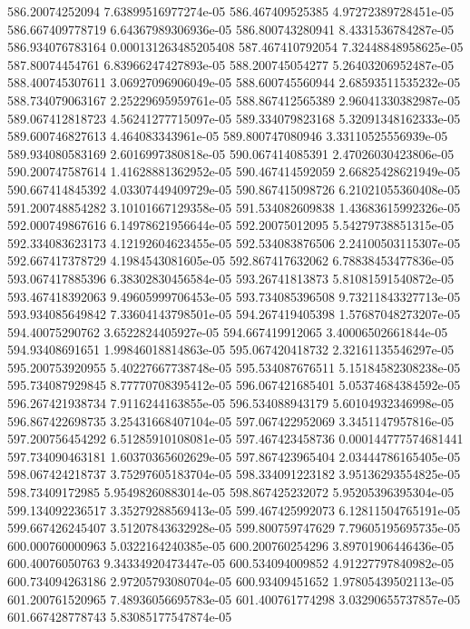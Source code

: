 {586.20074252094 7.63899516977274e-05
586.467409525385 4.97272389728451e-05
586.667409778719 6.64367989306936e-05
586.800743280941 8.4331536784287e-05
586.934076783164 0.000131263485205408
587.467410792054 7.32448848958625e-05
587.80074454761 6.83966247427893e-05
588.200745054277 5.26403206952487e-05
588.400745307611 3.06927096906049e-05
588.600745560944 2.68593511535232e-05
588.734079063167 2.25229695959761e-05
588.867412565389 2.96041330382987e-05
589.067412818723 4.56241277715097e-05
589.334079823168 5.32091348162333e-05
589.600746827613 4.464083343961e-05
589.800747080946 3.33110525556939e-05
589.934080583169 2.6016997380818e-05
590.067414085391 2.47026030423806e-05
590.200747587614 1.41628881362952e-05
590.467414592059 2.66825428621949e-05
590.667414845392 4.03307449409729e-05
590.867415098726 6.21021055360408e-05
591.200748854282 3.10101667129358e-05
591.534082609838 1.43683615992326e-05
592.000749867616 6.14978621956644e-05
592.20075012095 5.54279738851315e-05
592.334083623173 4.12192604623455e-05
592.534083876506 2.24100503115307e-05
592.667417378729 4.1984543081605e-05
592.867417632062 6.78838453477836e-05
593.067417885396 6.38302830456584e-05
593.26741813873 5.81081591540872e-05
593.467418392063 9.49605999706453e-05
593.734085396508 9.73211843327713e-05
593.934085649842 7.33604143798501e-05
594.267419405398 1.57687048273207e-05
594.40075290762 3.6522824405927e-05
594.667419912065 3.40006502661844e-05
594.93408691651 1.99846018814863e-05
595.067420418732 2.32161135546297e-05
595.200753920955 5.40227667738748e-05
595.534087676511 5.15184582308238e-05
595.734087929845 8.77770708395412e-05
596.067421685401 5.05374684384592e-05
596.267421938734 7.9116244163855e-05
596.534088943179 5.60104932346998e-05
596.867422698735 3.25431668407104e-05
597.067422952069 3.3451147957816e-05
597.200756454292 6.51285910108081e-05
597.467423458736 0.000144777574681441
597.734090463181 1.60370365602629e-05
597.867423965404 2.03444786165405e-05
598.067424218737 3.75297605183704e-05
598.334091223182 3.95136293554825e-05
598.73409172985 5.95498260883014e-05
598.867425232072 5.95205396395304e-05
599.134092236517 3.35279288569413e-05
599.467425992073 6.12811504765191e-05
599.667426245407 3.51207843632928e-05
599.800759747629 7.79605195695735e-05
600.000760000963 5.0322164240385e-05
600.200760254296 3.89701906446436e-05
600.40076050763 9.34334920473447e-05
600.534094009852 4.91227797840982e-05
600.734094263186 2.97205793080704e-05
600.93409451652 1.97805439502113e-05
601.200761520965 7.48936056695783e-05
601.400761774298 3.03290655737857e-05
601.667428778743 5.83085177547874e-05
}
